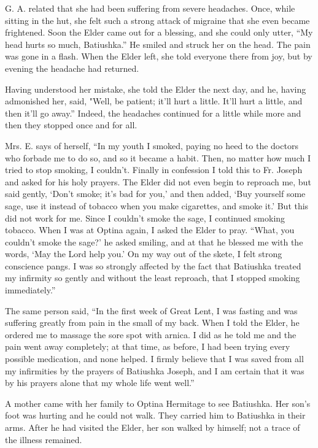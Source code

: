 G. A. related that she had been suffering from severe headaches. Once, while sitting in the hut, she felt such a strong attack of migraine that she even became frightened. Soon the Elder came out for a blessing, and she could only utter, “My head hurts so much, Batiushka.” He smiled and struck her on the head. The pain was gone in a flash. When the Elder left, she told everyone there from joy, but by evening the headache had returned.

Having understood her mistake, she told the Elder the next day, and he, having admonished her, said, "Well, be patient; it'll hurt a little. It'll hurt a little, and then it'll go away.” Indeed, the headaches continued for a little while more and then they stopped once and for all.

Mrs. E. says of herself, “In my youth I smoked, paying no heed to the doctors who forbade me to do so, and so it became a habit. Then, no matter how much I tried to stop smoking, I couldn't. Finally in confession I told this to Fr. Joseph and asked for his holy prayers. The Elder did not even begin to reproach me, but said gently, ‘Don't smoke; it's bad for you,' and then added, ‘Buy yourself some sage, use it instead of tobacco when you make cigarettes, and smoke it.' But this did not work for me. Since I couldn't smoke the sage, I continued smoking tobacco. When I was at Optina again, I asked the Elder to pray. “What, you couldn't smoke the sage?' he asked smiling, and at that he blessed me with the words, ‘May the Lord help you.' On my way out of the skete, I felt strong conscience pangs. I was so strongly affected by the fact that Batiushka treated my infirmity so gently and without the least reproach, that I stopped smoking immediately.”

The same person said, “In the first week of Great Lent, I was fasting and was suffering greatly from pain in the small of my back. When I told the Elder, he ordered me to massage the sore spot with arnica. I did as he told me and the pain went away completely; at that time, as before, I had been trying every possible medication, and none helped. I firmly believe that I was saved from all my infirmities by the prayers of Batiushka Joseph, and I am certain that it was by his prayers alone that my whole life went well.”

A mother came with her family to Optina Hermitage to see Batiushka. Her son's foot was hurting and he could not walk. They carried him to Batiushka in their arms. After he had visited the Elder, her son walked by himself; not a trace of the illness remained.


